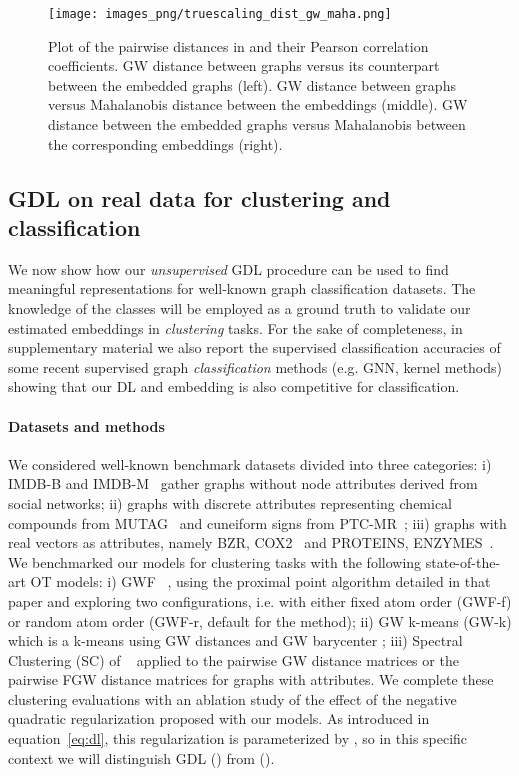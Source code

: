 \documentclass{article}
\def\eqref#1{equation~\ref{#1}}
\begin{document}
	
	\begin{figure}[t]
		\centering
		\texttt{[image: images\_png/truescaling\_dist\_gw\_maha.png]}\vspace{-1mm}
		\caption{Plot of the pairwise distances in  and their Pearson 
			correlation coefficients. GW distance between graphs versus its counterpart between the embedded graphs (left). GW distance between graphs versus  Mahalanobis distance between the embeddings (middle). GW distance between the embedded graphs versus Mahalanobis between the corresponding embeddings (right). } \label{fig:dist}
	\end{figure}
	
	
	\subsection{GDL on real data for clustering and classification}\label{subsec:real1} 
	We now show how our \emph{unsupervised} GDL procedure can be used to find meaningful representations for well-known graph classification datasets. The knowledge of the classes will be
	employed as a ground truth to validate our estimated embeddings in \emph{clustering} tasks. 
	For the sake of completeness, in supplementary material we also report the supervised
	classification accuracies of some recent supervised graph \emph{classification}
	methods (e.g. GNN, kernel methods) showing that our DL and embedding is
	also competitive for classification.
	\paragraph{Datasets and methods} We considered well-known benchmark datasets divided into three categories: i) IMDB-B and IMDB-M~\citep{yanardag-deep-2015} gather graphs without node attributes derived from social networks; ii) graphs with discrete attributes representing chemical compounds from MUTAG~\citep{debnath1991structure} and cuneiform signs from PTC-MR~\citep{krichene2015efficient}; iii) graphs with real vectors as attributes, namely  BZR, COX2~\citep{sutherland2003spline}
	and PROTEINS, ENZYMES~\citep{borgwardt2005shortest}. We benchmarked our models for clustering tasks with the following state-of-the-art OT models: 
	i) GWF ~\citep{xu_gromov-wasserstein_2019}, using the proximal point algorithm  detailed in that paper and exploring two configurations, i.e. with either fixed atom order (GWF-f) or random atom order (GWF-r, default for the method); ii) GW k-means (GW-k)  which is a k-means using GW distances and GW barycenter \citep{peyre2016gromov};
	iii) Spectral Clustering (SC) of ~\citep{shi2000normalized,stella2003multiclass} applied to the pairwise GW distance matrices or the pairwise FGW distance matrices for graphs with attributes. We complete these clustering evaluations with an ablation study of the effect of the negative quadratic regularization proposed with our models. As introduced in \eqref{eq:dl}, this regularization is parameterized by , so in this specific context we will distinguish GDL () from  ().
	
\end{document}
